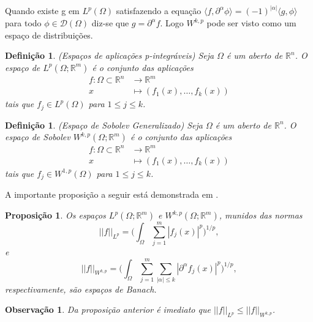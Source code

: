 \documentclass[12pt]{book}
\newtheorem{definicao}[teorema]{Definição}
\newtheorem{observacao}[teorema]{Observação}
\newtheorem{proposicao}[teorema]{Proposição}
\newcommand{\espacoLp}[1]{L^{p}(#1)}
\newcommand{\espacoLpcontradominio}[2]{L^{p}(#1;#2)}
\newcommand{\espacosobolev}[1]{W^{1,p}(#1)}
\newcommand{\espacosobolevgeneralizadocontra}[2]{W^{k,p}(#1; #2)}
\newcommand{\funcoesteste}{\funcoestestegeral{\Omega}}
\newcommand{\funcoestestegeral}[1]{\mathcal{D}(#1)}
\newcommand{\normaLp}[1]{||#1||_{L^{p}}}
\newcommand{\normaLpdefinicao}[2]{ \Big(\int_{#2}#1^{p}\Big)^{1/p}}
\newcommand{\normaWpgeneralizado}[1]{||#1||_{W^{k,p}}}
\newcommand{\produtointerno}[2]{\langle #1, #2 \rangle}
\newcommand{\real}[1]{\mathbb{R}^{#1}}
\begin{document}
	Quando existe g em $\espacoLp{\Omega}$ satisfazendo a equação $\produtointerno{f}{\partial^{\alpha}\phi} = (-1)^{|\alpha|}\produtointerno{g}{\phi}$ para todo $\phi\in \funcoesteste$ diz-se que $g = \partial^{\alpha}f$. Logo $W^{k,p}$ pode ser visto como um espaço de distribuições.
	
	
	\begin{definicao}
		(Espaços de aplicações p-integráveis) Seja $\Omega$ é um aberto de $\real{n}$. O espaço de $\espacoLpcontradominio{\Omega}{\real{m}}$ é o conjunto das aplicações 
		$$
		\begin{aligned}
		f:\Omega \subset\real{n} &\to \real{m}
		\\
		x &\mapsto (f_{1}(x), \dots, f_{k}(x))
		\end{aligned}
		$$ 
		tais que $f_{j} \in \espacoLp{\Omega}$ para $1\leq j \leq k$.
 	\end{definicao}
	
	\begin{definicao}\label{definicao_espalo_sobolev_generalizado}
		(Espaço de Sobolev Generalizado) Seja $\Omega$ é um aberto de $\real{n}$. O espaço de Sobolev $\espacosobolevgeneralizadocontra{\Omega}{\real{m}}$ é o conjunto das aplicações  
		$$
		\begin{aligned}
		f:\Omega \subset\real{n} &\to \real{m}
		\\
		x &\mapsto (f_{1}(x), \dots, f_{k}(x))
		\end{aligned}
		$$ 
		tais que $f_{j} \in \espacosobolev{\Omega}$ para $1\leq j \leq k$.
	\end{definicao}
	
	A importante proposição a seguir está demonstrada em \cite{breazis_sobolev_spaces}.
	
	\begin{proposicao}
		Os espaços $\espacoLpcontradominio{\Omega}{\real{m}}$ e $\espacosobolevgeneralizadocontra{\Omega}{\real{m}}$, munidos das normas 
		$$
		\normaLp{f} =\normaLpdefinicao{\sum_{j=1}^{m} |f_{j}(x)|}{\Omega},
		$$
		e
		$$
		\normaWpgeneralizado{f} =\normaLpdefinicao{\sum_{j=1}^{m} \sum_{|\alpha|\leq k}|\partial^{\alpha}f_{j}(x)|}{\Omega},
		$$
		respectivamente, são espaços de Banach.
	\end{proposicao}
	
	
	\begin{observacao}
		Da proposição anterior é imediato que $\normaLp{f} \leq \normaWpgeneralizado{f}$.
	\end{observacao}
	
\end{document}
